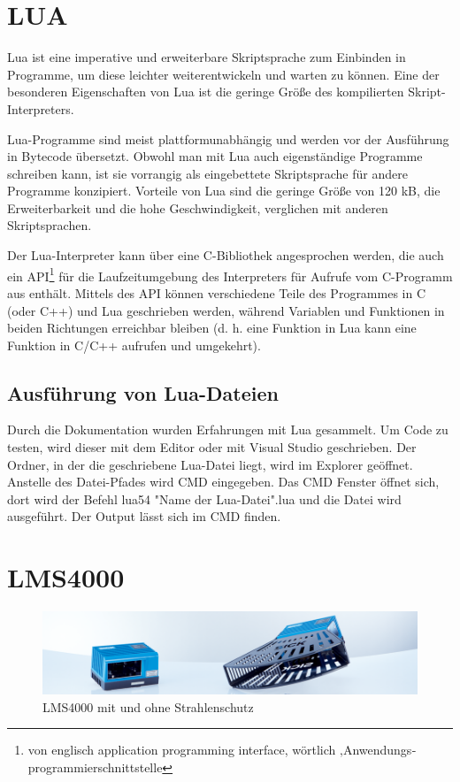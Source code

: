 \section{LUA}

Lua ist eine imperative und erweiterbare Skriptsprache zum Einbinden in Programme, um diese leichter weiterentwickeln und warten zu können. Eine der besonderen Eigenschaften von Lua ist die geringe Größe des kompilierten Skript-Interpreters.

Lua-Programme sind meist plattformunabhängig und werden vor der Ausführung in Bytecode übersetzt. Obwohl man mit Lua auch eigenständige Programme schreiben kann, ist sie vorrangig als eingebettete Skriptsprache für andere Programme konzipiert. Vorteile von Lua sind die geringe Größe von 120 kB, die Erweiterbarkeit und die hohe Geschwindigkeit, verglichen mit anderen Skriptsprachen.

Der Lua-Interpreter kann über eine C-Bibliothek angesprochen werden, die auch ein API\footnote{von englisch application programming interface, wörtlich ‚Anwendungs­programmier­schnittstelle} für die Laufzeitumgebung des Interpreters für Aufrufe vom C-Programm aus enthält. Mittels des API können verschiedene Teile des Programmes in C (oder C++) und Lua geschrieben werden, während Variablen und Funktionen in beiden Richtungen erreichbar bleiben (d. h. eine Funktion in Lua kann eine Funktion in C/C++ aufrufen und umgekehrt).

\subsection{Ausführung von Lua-Dateien}

Durch die Dokumentation wurden Erfahrungen mit Lua gesammelt.\cite{Ierusalimschy.2006} Um Code zu testen, wird dieser mit dem Editor oder mit Visual Studio geschrieben. Der Ordner, in der die geschriebene Lua-Datei liegt, wird im Explorer geöffnet. Anstelle des Datei-Pfades wird CMD eingegeben. Das CMD Fenster öffnet sich, dort wird der Befehl lua54 "Name der Lua-Datei".lua und die Datei wird ausgeführt. Der Output lässt sich im CMD finden.\cite{Ierusalimschy.2013}

\section{LMS4000}

\begin{figure}[h]
\centering
\includegraphics[width=13cm]{Bilder/LMS4000.png}
\caption{LMS4000 mit und ohne Strahlenschutz}
\label{LMS4000 mit und ohne Strahlenschutz}
\end{figure}



